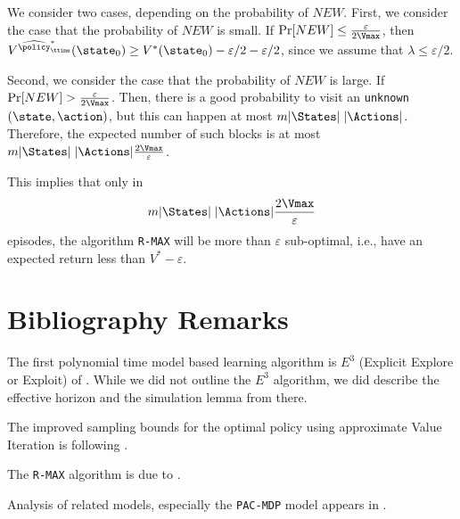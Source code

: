 We consider two cases, depending on the probability of $NEW$. First,
we consider the case that the probability of $NEW$ is small. If
$\Pr[NEW]\leq \frac{\varepsilon}{2\Vmax}$, then
$V^{\widehat{\policy}^*_\ttime}(\state_0)\geq V^*(\state_0)
-\varepsilon/2 -\varepsilon/2$, since we assume that $\lambda\leq
\varepsilon/2$.

Second, we consider the case that the probability of $NEW$ is large.
If $\Pr[NEW] > \frac{\varepsilon}{2\Vmax}$. Then, there is a good
probability to visit an {\tt unknown} $(\state,\action)$, but this
can happen at most $m|\States|\;|\Actions|$. Therefore, the expected
number of such blocks is at most
$m|\States|\;|\Actions|\frac{2\Vmax}{\varepsilon}$.

This implies that only in
\[
m|\States|\;|\Actions|\frac{2\Vmax}{\varepsilon}
\]
episodes, the algorithm {\tt R-MAX} will be more than $\varepsilon$
sub-optimal, i.e., have an expected return less than
$V^*-\varepsilon$.

\section{Bibliography Remarks}


The first polynomial time model based learning algorithm is $E^3$
(Explicit Explore or Exploit) of \cite{KearnsS02}. While we did not
outline the $E^3$ algorithm, we did describe the effective horizon
and the simulation lemma from there.

The improved sampling bounds for the optimal policy using
approximate Value Iteration is following \cite{KearnsS98a}.

The {\tt R-MAX} algorithm is due to \cite{BrafmanT02}.

Analysis of related models, especially the {\tt PAC-MDP} model
appears in \cite{StrehlLL09,Li2012}.
